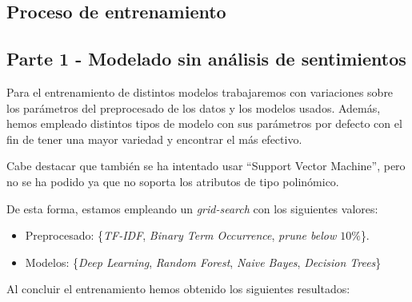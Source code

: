 \documentclass[es]{uc3mreport}
\begin{document}
\begin{report}
\section{Proceso de entrenamiento}
\label{chap:train}

\subsection{Parte 1 - Modelado sin análisis de sentimientos}
\label{sec:parte1}

    Para el entrenamiento de distintos modelos trabajaremos con variaciones
    sobre los parámetros del preprocesado de los datos y los modelos usados.
    Además, hemos empleado distintos tipos de modelo con sus
    parámetros por defecto con el fin de tener una mayor variedad y encontrar
    el más efectivo.

    Cabe destacar que también se ha intentado usar ``Support Vector Machine'',
    pero no se ha podido ya que no soporta los atributos de tipo polinómico.

    De esta forma, estamos empleando un \textit{grid-search} con los siguientes valores:
    \begin{itemize}
        \item Preprocesado: \{\textit{TF-IDF}, \textit{Binary Term Occurrence}, \textit{prune below $10\%$}\}.
        \item Modelos: \{\textit{Deep Learning}, \textit{Random Forest}, \textit{Naive Bayes}, \textit{Decision Trees}\}
    \end{itemize}

    Al concluir el entrenamiento hemos obtenido los siguientes resultados:


\end{report}
\end{document}
